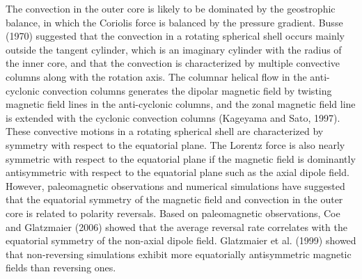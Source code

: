 The convection in the outer core is likely to be dominated by the geostrophic balance, in which the Coriolis force is balanced by the pressure gradient.
Busse (1970) 
suggested that the convection in a rotating spherical shell occurs mainly outside the tangent cylinder, which is an imaginary cylinder with the radius of the inner core, and that the convection is characterized by multiple convective columns along with the rotation axis. 
The columnar helical flow in the anti-cyclonic convection columns generates the dipolar magnetic field by twisting magnetic field lines in the anti-cyclonic columns, and the zonal magnetic field line is extended with the cyclonic convection columns (Kageyama and Sato, 1997). %
These convective motions in a rotating spherical shell are characterized by symmetry with respect to the equatorial plane.
The Lorentz force is also nearly symmetric with respect to the equatorial plane if the magnetic field is dominantly antisymmetric with respect to the equatorial plane such as the axial dipole field.
However, paleomagnetic observations and numerical simulations have suggested that the equatorial symmetry of the magnetic field and convection in the outer core is related to polarity reversals.
%
Based on paleomagnetic observations, Coe and Glatzmaier (2006) showed that the average reversal rate correlates with the equatorial symmetry of the non-axial dipole field.
Glatzmaier et al. (1999) showed that non-reversing simulations exhibit more equatorially antisymmetric magnetic fields than reversing ones.

